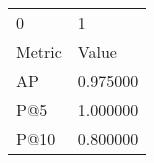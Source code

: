 \begin{tabular}{ll}
0 & 1 \\
Metric & Value \\
AP & 0.975000 \\
P@5 & 1.000000 \\
P@10 & 0.800000 \\
\end{tabular}
